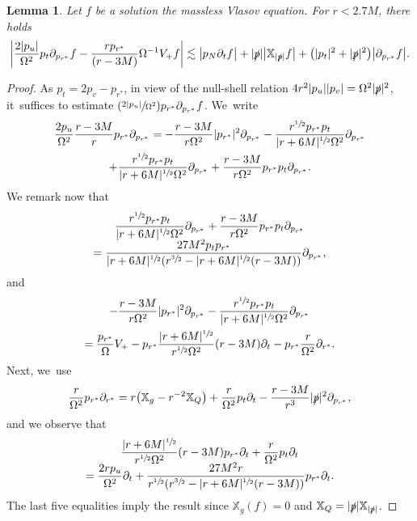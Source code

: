 \documentclass[10pt]{amsart}
\newcommand{\Psfrac}[2]{(\sfrac{#1}{#2})}
\theoremstyle{plain}
\newtheorem{lemma}[proposition]{Lemma}
\theoremstyle{definition}
\newcommand\T{{\mathbb{X}}}
\begin{document}
\begin{lemma}\label{LemBoundpartialpr}
Let $f$ be a solution the massless Vlasov equation. For $r < 2.7M$, there holds\vspace*{-3pt}
\[
\bigg| \frac{2|p_u|}{\Omega^2} p_t \partial_{p_{r^*}} f-\frac{rp_{r^*}}{(r-3M)} \Omega^{-1} V_+ f \bigg| \lesssim \big| p_N \partial_t f \big|+|\slashed{p}|\big| \T_{|\slashed{p}|} f \big|+ \bigl(|p_t|^2+ |\slashed{p}|^2\bigr) \big| \partial_{p_{r^*}} f \big|.
\]
\end{lemma}
\begin{proof}
As $p_t=2p_v-p_{r^*}$, in view of the null-shell relation $4r^2|p_u||p_v|=\Omega^2 |\slashed{p}|^2$, it~suffices to estimate $\Psfrac{2|p_u|}{\Omega^2} p_{r^*} \partial_{p_{r^*}} f$. We~write\vspace*{-5pt}
\begin{multline*}
\frac{2p_u}{\Omega^2}\frac{r-3M}{r} p_{r^*} \partial_{p_{r^*}} = -\frac{r-3M}{r\Omega^2}|p_{r^*}|^2 \partial_{p_{r^*}}-\frac{r^{\sfrac{1}{2}}p_{r^*}p_t}{|r+6M|^{\sfrac{1}{2}} \Omega^2} \partial_{p_{r^*}} \\
+ \frac{r^{\sfrac{1}{2}} p_{r^*}p_t}{|r+6M|^{\sfrac{1}{2}} \Omega^2} \partial_{p_{r^*}}+\frac{r-3M}{r\Omega^2}p_{r^*}p_t \partial_{p_{r^*}}.
\end{multline*}
We remark now that\vspace*{-3pt}
\begin{multline*}
\frac{r^{\sfrac{1}{2}} p_{r^*}p_t}{|r+6M|^{\sfrac{1}{2}} \Omega^2} \partial_{p_{r^*}}+\frac{r-3M}{r\Omega^2}p_{r^*}p_t \partial_{p_{r^*}}\\[-5pt]
=\frac{27M^2p_tp_{r^*}}{|r+6M|^{\sfrac{1}{2}} (r^{\sfrac{3}{2}}-|r+6M|^{\sfrac{1}{2}} (r-3M))} \partial_{p_{r^*}},
\end{multline*}
and
\begin{multline*}
-\frac{r-3M}{r\Omega^2}|p_{r^*}|^2 \partial_{p_{r^*}}-\frac{r^{\sfrac{1}{2}}p_{r^*}p_t}{|r+6M|^{\sfrac{1}{2}} \Omega^2} \partial_{p_{r^*}}\\
= \frac{p_{r^*}}{\Omega} V_+-p_{r^*}\frac{|r+6M|^{\sfrac{1}{2}}}{r^{\sfrac{1}{2}}\Omega^2}(r-3M) \partial_t
-p_{r^*}\frac{r}{\Omega^2} \partial_{r^*}.
\end{multline*}
Next, we~use\vspace*{-3pt}
\begin{align*}
\frac{r}{\Omega^2} p_{r^*}\partial_{r^*}= r \bigl(\T_g-r^{-2} \T_Q \bigr)+\frac{r}{\Omega^2}p_t \partial_t-\frac{r-3M}{r^3}|\slashed{p}|^2 \partial_{p_{r^*}},
\end{align*}
and we observe that\vspace*{-5pt}
\begin{multline*}
\frac{|r+6M|^{\sfrac{1}{2}}}{r^{\sfrac{1}{2}}\Omega^2}(r-3M) p_{r^*} \partial_t+\frac{r}{\Omega^2}p_t \partial_t\\[-5pt]
=\frac{2rp_u}{\Omega^2} \partial_t+\frac{27M^2r}{r^{\sfrac{1}{2}}(r^{\sfrac{3}{2}}-|r+6M|^{\sfrac{1}{2}}(r-3M))} p_{r^*} \partial_t.
\end{multline*}
The last five equalities imply the result since $\T_g (f)=0$ and $\T_Q=|\slashed{p}|\T_{|\slashed{p}|}$.
\end{proof}
\end{document}
